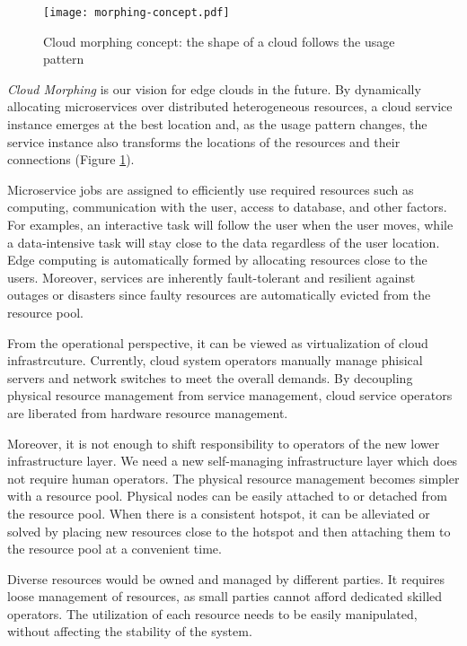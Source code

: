 \begin{figure}[tb]
  \begin{center}
    \texttt{[image: morphing-concept.pdf]}
    \vspace{-2.0ex}
    \caption{Cloud morphing concept: the shape of a cloud follows the
      usage pattern}
    \label{fig:concept}
  \end{center}
\end{figure}

{\em Cloud Morphing} is our vision for edge clouds in the future.
By dynamically allocating microservices over distributed
heterogeneous resources, a cloud service instance emerges at the best
location and, as the usage pattern changes, the service instance also
transforms the locations of the resources and their connections
(Figure \ref{fig:concept}).

Microservice jobs are assigned to efficiently use required resources
such as computing, communication with the user, access to
database, and other factors.
For examples, an interactive task will follow the user when the user
moves, while a data-intensive task will stay close to the data
regardless of the user location.
Edge computing is automatically formed by allocating resources close to
the users.
Moreover, services are inherently fault-tolerant and resilient
against outages or disasters since faulty resources are
automatically evicted from the resource pool.

From the operational perspective, it can be viewed as virtualization
of cloud infrastrcuture.
Currently, cloud system operators manually manage phisical servers and
network switches to meet the overall demands.
By decoupling physical resource management from service management,
cloud service operators are liberated from hardware resource management.

Moreover, it is not enough to shift responsibility to operators of the
new lower infrastructure layer. We need a new self-managing
infrastructure layer which does not require human operators.
The physical resource management becomes simpler with a resource pool.
Physical nodes can be easily attached to or detached from the resource pool.
When there is a consistent hotspot, it can be alleviated or solved by
placing new resources close to the hotspot and then attaching them to
the resource pool at a convenient time.

Diverse resources would be owned and managed by different parties.
It requires loose management of resources, as small parties cannot
afford dedicated skilled operators.
The utilization of each resource needs to be easily manipulated,
without affecting the stability of the system.

